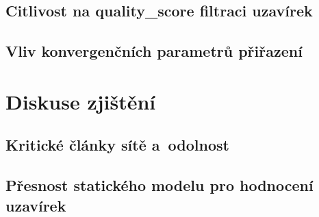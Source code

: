 \subsection{Citlivost na quality\_score filtraci uzavírek}

\subsection{Vliv konvergenčních parametrů přiřazení}


\section{Diskuse zjištění}
\label{sec:diskuse}

\subsection{Kritické články sítě a~odolnost}

\subsection{Přesnost statického modelu pro hodnocení uzavírek}

